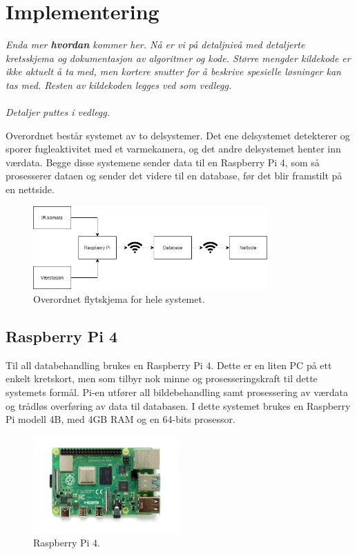 \section{Implementering}
\label{sec:implementering}
\textit{Enda mer \textbf{hvordan} kommer her. Nå er vi på detaljnivå med detaljerte kretsskjema og dokumentasjon av algoritmer og kode. Større mengder kildekode er ikke aktuelt å ta med, men kortere snutter for å beskrive spesielle løsninger kan tas med. Resten av kildekoden legges ved som vedlegg. \\
\\
Detaljer puttes i vedlegg.}

Overordnet består systemet av to delsystemer. Det ene delsystemet detekterer og sporer fugleaktivitet med et varmekamera, og det andre delsystemet henter inn værdata. Begge disse systemene sender data til en Raspberry Pi 4, som så prosesserer dataen og sender det videre til en database, før det blir framstilt på en nettside. 

\begin{figure}[H]
    \centering
    \includegraphics[width=0.8\textwidth]{implementering/implementering.png}
    \caption{Overordnet flytskjema for hele systemet.}
    \label{fig:implementasjon}
\end{figure}


\subsection{Raspberry Pi 4}

Til all databehandling brukes en Raspberry Pi 4. Dette er en liten PC på ett enkelt kretskort, men som tilbyr nok minne og prosesseringskraft til dette systemets formål. Pi-en utfører all bildebehandling samt prosessering av værdata og trådløs overføring av data til databasen. I dette systemet brukes en Raspberry Pi modell 4B, med 4GB RAM og en 64-bits prosessor.

\begin{figure}[H]
    \centering
    \includegraphics[width=0.5\textwidth]{implementering/pi4.png}
    \caption{Raspberry Pi 4.}
    \label{fig:pi}
\end{figure}

